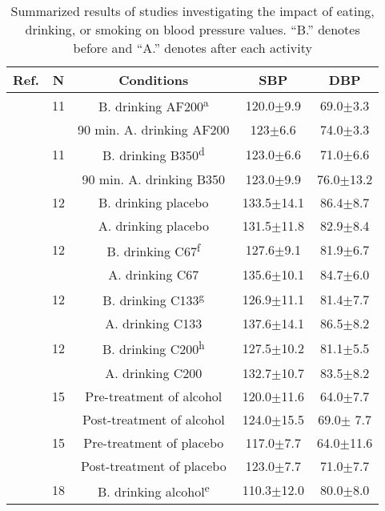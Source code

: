 \documentclass[journal,article,moreauthors]{Definitions/mdpi}
\begin{document}
\begin{table}[tb]
\caption{Summarized results of studies investigating the impact of eating, drinking, or smoking on blood pressure values. ``B.'' denotes before and ``A.'' denotes after each activity}\label{Tab: eating}
\begin{center}
\small{\begin{tabularx}{\textwidth}{rcccc}
\toprule
\textbf{Ref.} & \textbf{N} &\textbf{Conditions} & \textbf{SBP} & \textbf{DBP} \\
\hline
\citep{Nishiwaki2017-ud} & 11 & B. drinking AF200\textsuperscript{a} &  120.0$\pm$9.9 &  69.0$\pm$3.3 \\ 
& & 90 min. A. drinking AF200 & 123$\pm$6.6 & 74.0$\pm$3.3 
\\\hline
\citep{Nishiwaki2017-ud} & 11 & B. drinking B350\textsuperscript{d} &  123.0$\pm$6.6 &  71.0$\pm$6.6 \\ 
& & 90 min. A. drinking B350 & 123.0$\pm$9.9 & 76.0$\pm$13.2 
\\\hline
\citep{McMullen2011-qu} & 12 & B. drinking placebo &  133.5$\pm$14.1 &  86.4$\pm$8.7 \\ 
& & A. drinking placebo & 131.5$\pm$11.8 & 82.9$\pm$8.4 
\\\hline
\citep{McMullen2011-qu} & 12 & B. drinking C67\textsuperscript{f} &  127.6$\pm$9.1 &  81.9$\pm$6.7 \\ 
& & A. drinking C67 & 135.6$\pm$10.1 & 84.7$\pm$6.0 
\\\hline
\citep{McMullen2011-qu} & 12 & B. drinking C133\textsuperscript{g} &  126.9$\pm$11.1 &  81.4$\pm$7.7 \\ 
& & A. drinking C133 & 137.6$\pm$14.1 & 86.5$\pm$8.2 
\\\hline
\citep{McMullen2011-qu} & 12 & B. drinking C200\textsuperscript{h} &  127.5$\pm$10.2 &  81.1$\pm$5.5 \\ 
& & A. drinking C200 & 132.7$\pm$10.7 & 83.5$\pm$8.2 
\\\hline
\citep{Carter2011-aw} & 15 & Pre-treatment of alcohol &  120.0$\pm$11.6 &  64.0$\pm$7.7 \\ 
& & Post-treatment of alcohol & 124.0$\pm$15.5 & 69.0$\pm$ 7.7 
\\\hline
\citep{Carter2011-aw} & 15 & Pre-treatment of placebo &  117.0$\pm$7.7 &  64.0$\pm$11.6 \\ 
& & Post-treatment of placebo & 123.0$\pm$7.7 & 71.0$\pm$7.7 
\\\hline
\citep{Fantin2016-bt} & 18 & B. drinking alcohol\textsuperscript{e} & 110.3$\pm$12.0 &  80.0$\pm$8.0 \\ 

\end{tabularx}}
\end{center}
\end{table}
\end{document}
